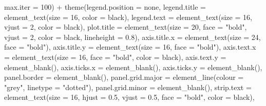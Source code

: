 \documentclass[
]{book}
\newenvironment{Shaded}{\begin{snugshade}}{\end{snugshade}}
\newcommand{\AttributeTok}[1]{\textcolor[rgb]{0.77,0.63,0.00}{#1}}
\newcommand{\DecValTok}[1]{\textcolor[rgb]{0.00,0.00,0.81}{#1}}
\newcommand{\FloatTok}[1]{\textcolor[rgb]{0.00,0.00,0.81}{#1}}
\newcommand{\FunctionTok}[1]{\textcolor[rgb]{0.00,0.00,0.00}{#1}}
\newcommand{\NormalTok}[1]{#1}
\newcommand{\SpecialCharTok}[1]{\textcolor[rgb]{0.00,0.00,0.00}{#1}}
\newcommand{\StringTok}[1]{\textcolor[rgb]{0.31,0.60,0.02}{#1}}
\begin{document}
\begin{Shaded}
\begin{Highlighting}[]
                         \AttributeTok{max.iter =} \DecValTok{100}\NormalTok{) }\SpecialCharTok{+}
        \FunctionTok{theme}\NormalTok{(}\AttributeTok{legend.position =} \StringTok{\textquotesingle{}none\textquotesingle{}}\NormalTok{,}
              \AttributeTok{legend.title =} \FunctionTok{element\_text}\NormalTok{(}\AttributeTok{size =} \DecValTok{16}\NormalTok{, }\AttributeTok{color =} \StringTok{\textquotesingle{}black\textquotesingle{}}\NormalTok{),}
              \AttributeTok{legend.text =} \FunctionTok{element\_text}\NormalTok{(}\AttributeTok{size =} \DecValTok{16}\NormalTok{, }\AttributeTok{vjust =} \DecValTok{2}\NormalTok{, }\AttributeTok{color =} \StringTok{\textquotesingle{}black\textquotesingle{}}\NormalTok{),}
              \AttributeTok{plot.title =} \FunctionTok{element\_text}\NormalTok{(}\AttributeTok{size =} \DecValTok{20}\NormalTok{, }\AttributeTok{face =} \StringTok{"bold"}\NormalTok{, }\AttributeTok{vjust =} \DecValTok{2}\NormalTok{, }\AttributeTok{color =} \StringTok{\textquotesingle{}black\textquotesingle{}}\NormalTok{, }\AttributeTok{lineheight =} \FloatTok{0.8}\NormalTok{),}
              \AttributeTok{axis.title.x =} \FunctionTok{element\_text}\NormalTok{(}\AttributeTok{size =} \DecValTok{24}\NormalTok{, }\AttributeTok{face =} \StringTok{"bold"}\NormalTok{),}
              \AttributeTok{axis.title.y =} \FunctionTok{element\_text}\NormalTok{(}\AttributeTok{size =} \DecValTok{16}\NormalTok{, }\AttributeTok{face =} \StringTok{"bold"}\NormalTok{),}
              \AttributeTok{axis.text.x =} \FunctionTok{element\_text}\NormalTok{(}\AttributeTok{size =} \DecValTok{16}\NormalTok{, }\AttributeTok{face =} \StringTok{"bold"}\NormalTok{, }\AttributeTok{color =} \StringTok{\textquotesingle{}black\textquotesingle{}}\NormalTok{),}
              \AttributeTok{axis.text.y =} \FunctionTok{element\_blank}\NormalTok{(),}
              \AttributeTok{axis.ticks.x =} \FunctionTok{element\_blank}\NormalTok{(),}
              \AttributeTok{axis.ticks.y =} \FunctionTok{element\_blank}\NormalTok{(),}
              \AttributeTok{panel.border =} \FunctionTok{element\_blank}\NormalTok{(),}
              \AttributeTok{panel.grid.major =} \FunctionTok{element\_line}\NormalTok{(}\AttributeTok{colour =} \StringTok{"grey"}\NormalTok{, }\AttributeTok{linetype =} \StringTok{"dotted"}\NormalTok{),}
              \AttributeTok{panel.grid.minor =} \FunctionTok{element\_blank}\NormalTok{(),}
              \AttributeTok{strip.text =} \FunctionTok{element\_text}\NormalTok{(}\AttributeTok{size =} \DecValTok{16}\NormalTok{, }\AttributeTok{hjust =} \FloatTok{0.5}\NormalTok{, }\AttributeTok{vjust =} \FloatTok{0.5}\NormalTok{, }\AttributeTok{face =} \StringTok{"bold"}\NormalTok{, }\AttributeTok{color =} \StringTok{\textquotesingle{}black\textquotesingle{}}\NormalTok{),}

\end{Highlighting}
\end{Shaded}
\end{document}
